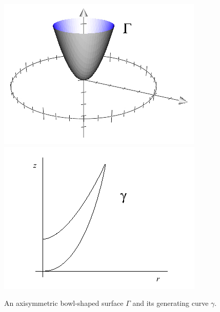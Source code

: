 \documentclass[11pt, oneside]{article}   	%
\begin{document}
\begin{figure}[h]
\caption{An axisymmetric bowl-shaped surface $\Gamma$ and its generating curve $\gamma$.}
\label{fig:1}
\centering
\includegraphics[scale=0.5]{bowl3}
\includegraphics[scale=0.5]{bowl}
\end{figure}
\end{document}
